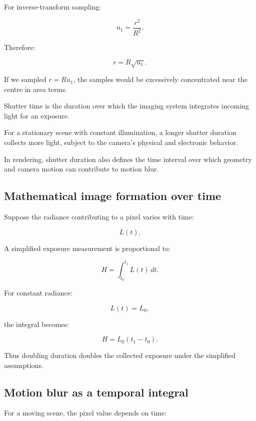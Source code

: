 For inverse-transform sampling:

\[ u_1=\frac{r^2}{R^2}. \]

Therefore:

\[ \boxed{r=R\sqrt{u_1}}. \]

If we sampled \(r=Ru_1\), the samples would be excessively concentrated near the centre in area terms.

Shutter time is the duration over which the imaging system integrates incoming light for an exposure.

For a stationary scene with constant illumination, a longer shutter duration collects more light, subject to the camera's physical and electronic behavior.

In rendering, shutter duration also defines the time interval over which geometry and camera motion can contribute to motion blur.

\subsection{Mathematical image formation over time}\label{02-foundations-ii-ch036-mathematical-image-formation-over-time}

\hypertarget{02-foundations-ii-ch036-mathematical-image-formation-over-time}{}

Suppose the radiance contributing to a pixel varies with time:

\[ L(t). \]

A simplified exposure measurement is proportional to:

\[ \boxed{ H=\int_{t_0}^{t_1}L(t)\,dt. } \]

For constant radiance:

\[ L(t)=L_0, \]

the integral becomes:

\[ \boxed{ H=L_0(t_1-t_0). } \]

Thus doubling duration doubles the collected exposure under the simplified assumptions.

\subsection{Motion blur as a temporal integral}\label{02-foundations-ii-ch036-motion-blur-as-a-temporal-integral}

\hypertarget{02-foundations-ii-ch036-motion-blur-as-a-temporal-integral}{}

For a moving scene, the pixel value depends on time:

